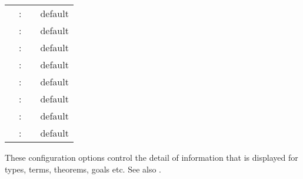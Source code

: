 \begin{isabellebody}
\begin{isamarkuptext}
\begin{tabular}{rcll}
    \indexdef{}{attribute}{names\_short}\hypertarget{attribute.names-short}{\hyperlink{attribute.names-short}{\mbox{\isa{names{\isaliteral{5F}{\isacharunderscore}}short}}}} & : & \isa{attribute} & default \isa{false} \\
    \indexdef{}{attribute}{names\_unique}\hypertarget{attribute.names-unique}{\hyperlink{attribute.names-unique}{\mbox{\isa{names{\isaliteral{5F}{\isacharunderscore}}unique}}}} & : & \isa{attribute} & default \isa{true} \\
    \indexdef{}{attribute}{eta\_contract}\hypertarget{attribute.eta-contract}{\hyperlink{attribute.eta-contract}{\mbox{\isa{eta{\isaliteral{5F}{\isacharunderscore}}contract}}}} & : & \isa{attribute} & default \isa{true} \\
    \indexdef{}{attribute}{goals\_limit}\hypertarget{attribute.goals-limit}{\hyperlink{attribute.goals-limit}{\mbox{\isa{goals{\isaliteral{5F}{\isacharunderscore}}limit}}}} & : & \isa{attribute} & default \isa{{\isadigit{1}}{\isadigit{0}}} \\
    \indexdef{}{attribute}{show\_main\_goal}\hypertarget{attribute.show-main-goal}{\hyperlink{attribute.show-main-goal}{\mbox{\isa{show{\isaliteral{5F}{\isacharunderscore}}main{\isaliteral{5F}{\isacharunderscore}}goal}}}} & : & \isa{attribute} & default \isa{false} \\
    \indexdef{}{attribute}{show\_hyps}\hypertarget{attribute.show-hyps}{\hyperlink{attribute.show-hyps}{\mbox{\isa{show{\isaliteral{5F}{\isacharunderscore}}hyps}}}} & : & \isa{attribute} & default \isa{false} \\
    \indexdef{}{attribute}{show\_tags}\hypertarget{attribute.show-tags}{\hyperlink{attribute.show-tags}{\mbox{\isa{show{\isaliteral{5F}{\isacharunderscore}}tags}}}} & : & \isa{attribute} & default \isa{false} \\
    \indexdef{}{attribute}{show\_question\_marks}\hypertarget{attribute.show-question-marks}{\hyperlink{attribute.show-question-marks}{\mbox{\isa{show{\isaliteral{5F}{\isacharunderscore}}question{\isaliteral{5F}{\isacharunderscore}}marks}}}} & : & \isa{attribute} & default \isa{true} \\
  \end{tabular}
  \medskip

  These configuration options control the detail of information that
  is displayed for types, terms, theorems, goals etc.  See also
  .

  \begin{description}


\end{description}
\end{isamarkuptext}
\end{isabellebody}
